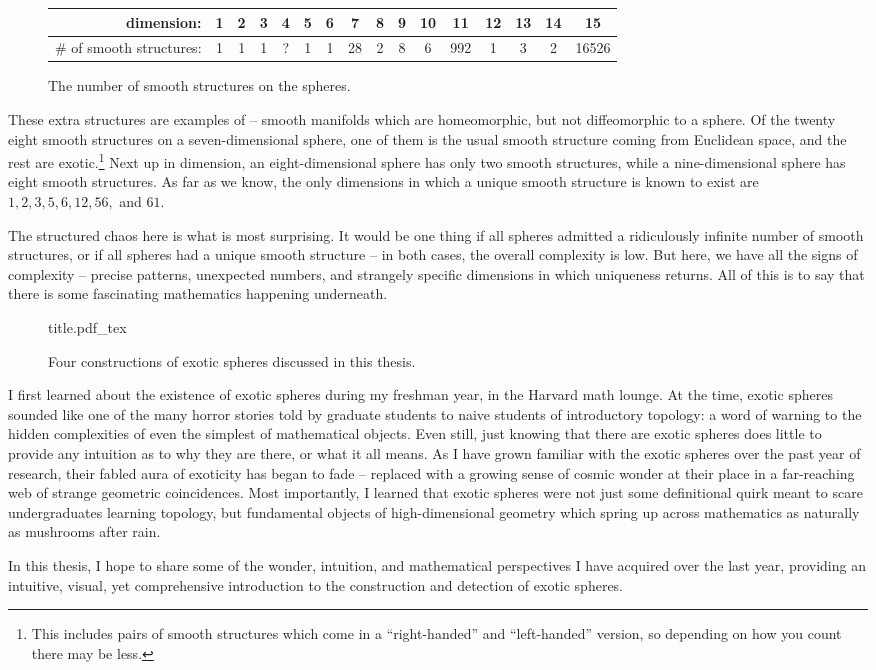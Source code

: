 \begin{figure}[ht]
	\renewcommand{\arraystretch}{1.2}
	\centering
	\begin{tabular}{r|c|c|c|c|c|c|c|c|c|c|c|c|c|c|c}
		\textrm{dimension:}               & 1 & 2 & 3 & 4 & 5 & 6 & 7  & 8 & 9 & 10 & 11  & 12 & 13 & 14 & 15    \\
		\hline
		\textrm{\# of smooth structures:} & 1 & 1 & 1 & ? & 1 & 1 & 28 & 2 & 8 & 6  & 992 & 1  & 3  & 2  & 16526 \\
	\end{tabular}
	\caption{The number of smooth structures on the spheres.}
\end{figure}

These extra structures are examples of  -- smooth manifolds which are homeomorphic, but not diffeomorphic to a sphere.
Of the twenty eight smooth structures on a seven-dimensional sphere, one of them is the usual smooth structure coming from Euclidean space, and the rest are exotic.\footnote{This includes pairs of smooth structures which come in a ``right-handed'' and ``left-handed'' version, so depending on how you count there may be less.} 
Next up in dimension, an eight-dimensional sphere has only two smooth structures, while a nine-dimensional sphere has eight smooth structures. 
As far as we know, the only dimensions in which a unique smooth structure is known to exist are $1,2,3,5,6,12,56,$ and $61$.

The structured chaos here is what is most surprising. 
It would be one thing if all spheres admitted a ridiculously infinite number of smooth structures, or if all spheres had a unique smooth structure -- in both cases, the overall complexity is low. 
But here, we have all the signs of complexity -- precise patterns, unexpected numbers, and strangely specific dimensions in which uniqueness returns. All of this is to say that there is some fascinating mathematics happening underneath.

\begin{figure}[ht]
	\centering
	{title.pdf_tex}
	\caption{Four constructions of exotic spheres discussed in this thesis.}
\end{figure}

\smallrule

I first learned about the existence of exotic spheres during my freshman year, in the Harvard math lounge. At the time, exotic spheres sounded like one of the many horror stories told by graduate students to naive students of introductory topology: a word of warning to the hidden complexities of even the simplest of mathematical objects. 
Even still, just knowing that there are exotic spheres does little to provide any intuition as to why they are there, or what it all means. 
As I have grown familiar with the exotic spheres over the past year of research, their fabled aura of exoticity has began to fade -- replaced with a growing sense of cosmic wonder at their place in a far-reaching web of strange geometric coincidences.
Most importantly, I learned that exotic spheres were not just some definitional quirk meant to scare undergraduates learning topology, 
but fundamental objects of high-dimensional geometry which spring up across mathematics as naturally as mushrooms after rain. 

In this thesis, I hope to share some of the wonder, intuition, and mathematical perspectives I have acquired over the last year, providing an intuitive, visual, yet comprehensive introduction to the construction and detection of exotic spheres.
